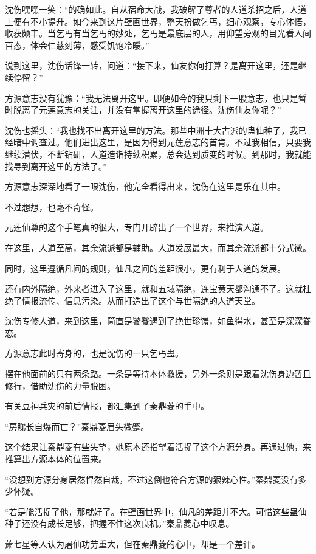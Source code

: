 \begin{this_body}
沈伤嘿嘿一笑：“的确如此。自从宿命大战，我破解了尊者的人道杀招之后，人道上便有不小提升。如今来到这片壁画世界，整天扮做乞丐，细心观察，专心体悟，收获颇丰。当乞丐有当乞丐的妙处，乞丐是最底层的人，用仰望旁观的目光看人间百态，体会仁慈刻薄，感受饥饱冷暖。”

说到这里，沈伤话锋一转，问道：“接下来，仙友你何打算？是离开这里，还是继续停留？”

方源意志没有犹豫：“我无法离开这里。即便如今的我只剩下一股意志，也只是暂时脱离了元莲意志的关注，并没有掌握离开这里的途径。沈伤仙友你呢？”

沈伤也摇头：“我也找不出离开这里的方法。那些中洲十大古派的蛊仙种子，我已经暗中调查过。他们进出这里，是因为得到元莲意志的首肯。不过我相信，只要我继续潜伏，不断钻研，人道造诣持续积累，总会达到质变的时候。到那时，我就能找寻到离开这里的方法了。”

方源意志深深地看了一眼沈伤，他完全看得出来，沈伤在这里是乐在其中。

不过想想，也毫不奇怪。

元莲仙尊的这个手笔真的很大，专门开辟出了一个世界，来推演人道。

在这里，人道至高，其余流派都是辅助。人道发展最大，而其余流派都十分式微。

同时，这里遵循凡间的规则，仙凡之间的差距很小，更有利于人道的发展。

还有内外隔绝，外来者进入了这里，就和五域隔绝，连宝黄天都沟通不了。这就杜绝了情报流传、信息污染。从而打造出了这个与世隔绝的人道天堂。

沈伤专修人道，来到这里，简直是饕餮遇到了绝世珍馐，如鱼得水，甚至是深深眷恋。

方源意志此时寄身的，也是沈伤的一只乞丐蛊。

摆在他面前的只有两条路。一条是等待本体救援，另外一条则是跟着沈伤身边暂且修行，借助沈伤的力量脱困。

有关豆神兵灾的前后情报，都汇集到了秦鼎菱的手中。

“房睇长自爆而亡？”秦鼎菱眉头微蹙。

这个结果让秦鼎菱有些失望，她原本还指望着活捉了这个方源分身。再通过他，来推算出方源本体的位置来。

“没想到方源分身居然悍然自裁，不过这倒也符合方源的狠辣心性。”秦鼎菱没有多少怀疑。

“若是能活捉了他，那就好了。在壁画世界中，仙凡的差距并不大。可惜这些蛊仙种子还没有成长足够，把握不住这次良机。”秦鼎菱心中叹息。

萧七星等人认为屠仙功劳重大，但在秦鼎菱的心中，却是一个差评。


\end{this_body}
